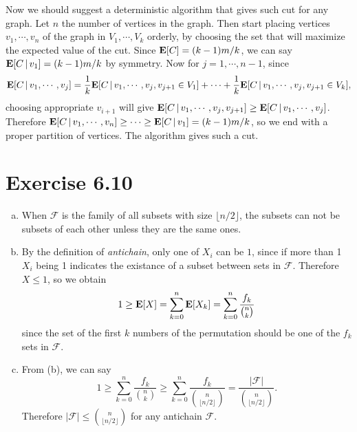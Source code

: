 \documentclass{article}
\begin{document}
\vspace{3mm}
Now we should suggest a deterministic algorithm that gives such cut for any graph.
Let $n$ the number of vertices in the graph.
Then start placing vertices $v_1, \cdots, v_n$ of the graph in $V_1, \cdots, V_k$ orderly, by choosing the set that will maximize the expected value of the cut.
Since $\mathbf{E}\qty[C] = {(k-1)m}/{k}$, we can say $\mathbf{E}\qty[C \,|\, v_1] = {(k-1)m}/{k}$ by symmetry.
Now for $j = 1, \cdots, n-1$, since 
$$\mathbf{E}\qty[C \,|\, v_1, \cdots, v_j] = \frac{1}{k}\mathbf{E}\qty[C \,|\, v_1, \cdots, v_j, v_{j+1} \in V_1] + \cdots + \frac{1}{k}\mathbf{E}\qty[C \,|\, v_1, \cdots, v_j, v_{j+1} \in V_{k}],$$
choosing appropriate $v_{i+1}$ will give $\mathbf{E}\qty[C \,|\, v_1, \cdots, v_j, v_{j+1}] \geq \mathbf{E}\qty[C \,|\, v_1, \cdots, v_j]$. 
Therefore $\mathbf{E}\qty[C \,|\, v_1, \cdots, v_n] \geq \cdots \geq \mathbf{E}\qty[C \,|\, v_1] = {(k-1)m}/{k}$, so we end with a proper partition of vertices.
The algorithm gives such a cut.

\section*{Exercise 6.10}
\begin{enumerate}[(a)]
    \item When $\mathcal{F}$ is the family of all subsets with size $\lfloor n/2 \rfloor$, the subsets can not be subsets of each other unless they are the same ones.
    \item By the definition of \textit{antichain}, only one of $X_i$ can be $1$, since if more than 1 $X_i$ being 1 indicates the existance of a subset between sets in $\mathcal{F}$.
    Therefore $X \leq 1$, so we obtain
    $$1 \geq \mathbf{E}\qty[X] = \sum_{k=0}^{n}\mathbf{E}\qty[X_k] = \sum_{k=0}^{n}\frac{f_k}{{n \choose k}}$$
    since the set of the first $k$ numbers of the permutation should be one of the $f_k$ sets in $\mathcal{F}$. 
    \item From (b), we can say
    $$1 \geq \sum_{k=0}^{n}\frac{f_k}{{n \choose k}} \geq \sum_{k=0}^{n}\frac{f_k}{{n \choose \lfloor n/2 \rfloor}} = \frac{|\mathcal{F}|}{{n \choose \lfloor n/2 \rfloor}}.$$
    Therefore $|\mathcal{F}| \leq {n \choose \lfloor n/2 \rfloor}$ for any antichain $\mathcal{F}$.
\end{enumerate}
\end{document}
